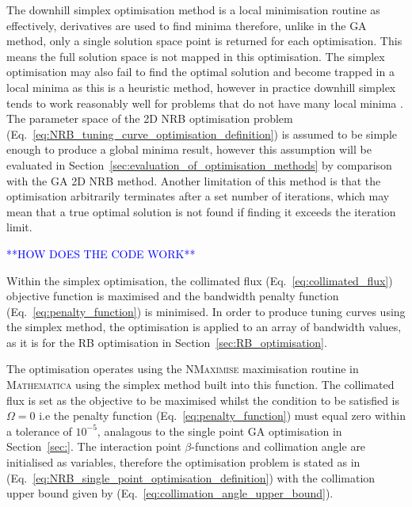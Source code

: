 \documentclass[../main.tex]{subfiles}
\begin{document}
The downhill simplex optimisation method is a local minimisation routine as effectively, derivatives are used to find minima \cite{jones2016design} therefore, unlike in the GA method, only a single solution space point is returned for each optimisation. This means the full solution space is not mapped in this optimisation. The simplex optimisation may also fail to find the optimal solution and become trapped in a local minima as this is a heuristic method, however in practice downhill simplex tends to work reasonably well for problems that do not have many local minima \cite{wolfram2021nmaximize}. The parameter space of the 2D NRB optimisation problem (Eq.~\ref{eq:NRB_tuning_curve_optimisation_definition}) is assumed to be simple enough to produce a global minima result, however this assumption will be evaluated in Section~\ref{sec:evaluation_of_optimisation_methods} by comparison with the GA 2D NRB method. Another limitation of this method is that the optimisation arbitrarily terminates after a set number of iterations, which may mean that a true optimal solution is not found if finding it exceeds the iteration limit.

\textcolor{blue}{**HOW DOES THE CODE WORK**}

Within the simplex optimisation, the collimated flux (Eq.~\ref{eq:collimated_flux}) objective function is maximised and the bandwidth penalty function (Eq.~\ref{eq:penalty_function}) is minimised. In order to produce tuning curves using the simplex method, the optimisation is applied to an array of bandwidth values, as it is for the RB optimisation in Section~\ref{sec:RB_optimisation}.

The optimisation operates using the \textsc{NMaximise} maximisation routine in \textsc{Mathematica} \cite{wolfram2021nmaximize} using the simplex method built into this function. The collimated flux is set as the objective to be maximised whilst the condition to be satisfied is $\Omega = 0$ i.e the penalty function (Eq.~\ref{eq:penalty_function}) must equal zero within a tolerance of $10^{-5}$, analagous to the single point GA optimisation in Section~\ref{sec:}. The interaction point $\beta$-functions and collimation angle are initialised as variables, therefore the optimisation problem is stated as in (Eq.~\ref{eq:NRB_single_point_optimisation_definition}) with the collimation upper bound given by (Eq.~\ref{eq:collimation_angle_upper_bound}).
\end{document}
